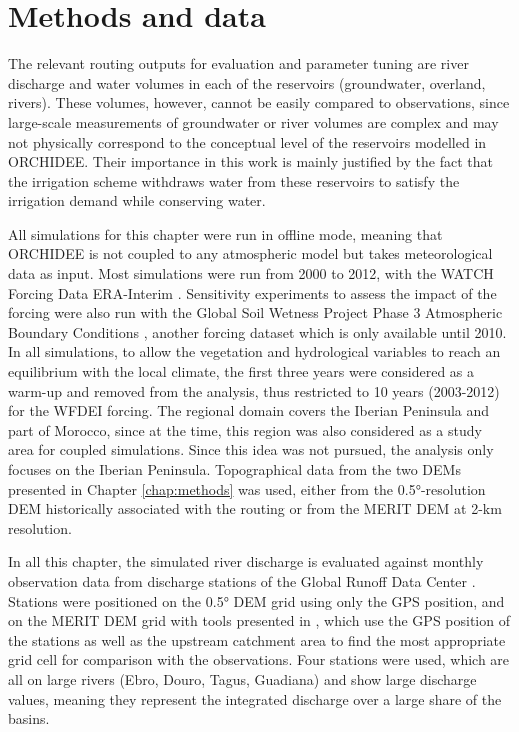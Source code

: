 \section{Methods and data}

The relevant routing outputs for evaluation and parameter tuning are river discharge and water volumes in each of the reservoirs (groundwater, overland, rivers). 
These volumes, however, cannot be easily compared to observations, since large-scale measurements of groundwater or river volumes are complex and may not physically correspond to the conceptual level of the reservoirs modelled in ORCHIDEE.
Their importance in this work is mainly justified by the fact that the irrigation scheme withdraws water from these reservoirs to satisfy the irrigation demand while conserving water.

All simulations for this chapter were run in offline mode, meaning that ORCHIDEE is not coupled to any atmospheric model but takes meteorological data as input. 
Most simulations were run from 2000 to 2012, with the WATCH Forcing Data ERA-Interim \citep[WFDEI, ][]{weedon_wfdei_2014}. Sensitivity experiments to assess the impact of the forcing were also run with the Global Soil Wetness Project Phase 3 Atmospheric Boundary Conditions \citep[GSWP3, ][]{kim_hyungjun_global_2017}, another forcing dataset which is only available until 2010.
In all simulations, to allow the vegetation and hydrological variables to reach an equilibrium with the local climate, the first three years were considered as a warm-up and removed from the analysis, thus restricted to 10 years (2003-2012) for the WFDEI forcing. The regional domain covers the Iberian Peninsula and part of Morocco, since at the time, this region was also considered as a study area for coupled simulations. Since this idea was not pursued, the analysis only focuses on the Iberian Peninsula.
Topographical data from the two DEMs presented in Chapter \ref{chap:methods} was used, either from the 0.5°-resolution DEM historically associated with the \std routing or from the MERIT DEM at 2-km resolution.

In all this chapter, the simulated river discharge is evaluated against monthly observation data from discharge stations of the Global Runoff Data Center \citep[GRDC, https://grdc.bafg.de,][]{fekete_global_2003}.
Stations were positioned on the 0.5° DEM grid using only the GPS position, and on the MERIT DEM grid with tools presented in \cite{polcher_hydrological_2023}, which use the GPS position of the stations as well as the upstream catchment area to find the most appropriate grid cell for comparison with the observations. 
Four stations were used, which are all on large rivers (Ebro, Douro, Tagus, Guadiana) and show large discharge values, meaning they represent the integrated discharge over a large share of the basins.

